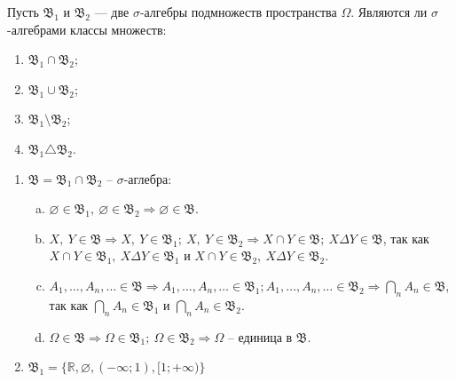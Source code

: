 \begin{task}{7}
Пусть $\mathfrak{B_1}$ и $\mathfrak{B_2}$ --- две $\sigma$-алгебры подмножеств пространства $\Omega$. Являются ли $\sigma$-алгебрами классы множеств: 
\begin{enumerate}[1)]
    \item $\mathfrak{B_1} \cap \mathfrak{B_2}$;
    \item $\mathfrak{B_1} \cup \mathfrak{B_2}$;
    \item $\mathfrak{B_1} \setminus \mathfrak{B_2}$;
    \item $\mathfrak{B_1} \triangle \mathfrak{B_2}$.
\end{enumerate}

\end{task}
\begin{solution}
\begin{enumerate}[1)]
    \item $\mathfrak{B} = \mathfrak{B}_1 \cap \mathfrak{B}_2$ -- $\sigma$-аглебра:
    \begin{enumerate}[a)]
        \item
        $\varnothing \in \mathfrak{B}_1, ~ \varnothing \in \mathfrak{B}_2 \Rightarrow \varnothing \in \mathfrak{B}$.
        
        \item
        $X,~Y \in \mathfrak{B} \Rightarrow X,~Y \in \mathfrak{B}_1; ~ X,~Y \in \mathfrak{B}_2 \Rightarrow X \cap Y \in \mathfrak{B};~ X \Delta Y \in \mathfrak{B}$, так как $X \cap Y \in \mathfrak{B}_1,~ X \Delta Y \in \mathfrak{B}_1$ и $X \cap Y \in \mathfrak{B}_2,~ X \Delta Y \in \mathfrak{B}_2$.
        
        \item
        $A_1, \ldots, A_n, \ldots \in \mathfrak{B} \Rightarrow A_1, \ldots, A_n, \ldots \in \mathfrak{B}_1; A_1, \ldots, A_n, \ldots \in \mathfrak{B}_2 \Rightarrow \underset{n}{\bigcap} A_n \in \mathfrak{B}$, так как $\underset{n}{\bigcap} A_n \in \mathfrak{B}_1$ и $\underset{n}{\bigcap} A_n \in \mathfrak{B}_2$.
        
        \item
        $\Omega \in \mathfrak{B} \Rightarrow \Omega \in \mathfrak{B}_1;~\Omega \in \mathfrak{B}_2 \Rightarrow \Omega$ -- единица в $\mathfrak{B}$.
    \end{enumerate}
    
    \item
    $\mathfrak{B_1} = \{\mathbb{R}, \varnothing, (-\infty; 1), [1; +\infty)\}$
    

\end{enumerate}
\end{solution}
